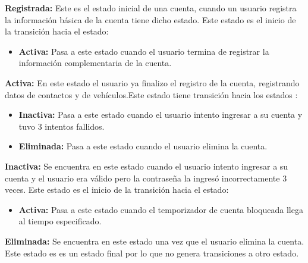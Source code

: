 \noindent \textbf{Registrada:} Este es el estado inicial de una cuenta, cuando un usuario registra la información básica de la cuenta tiene dicho estado. Este estado es el inicio de la transición hacia el estado:
\begin{itemize}
	
	\item \textbf{Activa:} Pasa a este estado cuando el usuario termina de registrar la información complementaria de la cuenta.
	
\end{itemize}

\noindent \textbf{Activa:} En este estado el usuario ya finalizo el registro de la cuenta, registrando datos de contactos y de vehículos.Este estado tiene transición hacia los estados :
\begin{itemize}
	
	\item \textbf{Inactiva:} Pasa a este estado cuando el usuario intento ingresar a su cuenta y tuvo 3 intentos fallidos.
	\item \textbf{Eliminada:} Pasa a este estado cuando el usuario elimina la cuenta. 
\end{itemize}

\noindent \textbf{Inactiva:} Se encuentra en este estado cuando el usuario intento ingresar a su cuenta y el usuario era válido pero la contraseña la ingresó incorrectamente 3 veces. Este estado es el inicio de la transición hacia el estado:
\begin{itemize}
	
	\item \textbf{Activa:} Pasa a este estado cuando el temporizador de cuenta bloqueada llega al tiempo especificado.
	
\end{itemize}

\noindent \textbf{Eliminada:} Se encuentra en este estado una vez que el usuario elimina la cuenta. Este estado es es un estado final por lo que no genera transiciones a otro estado.
